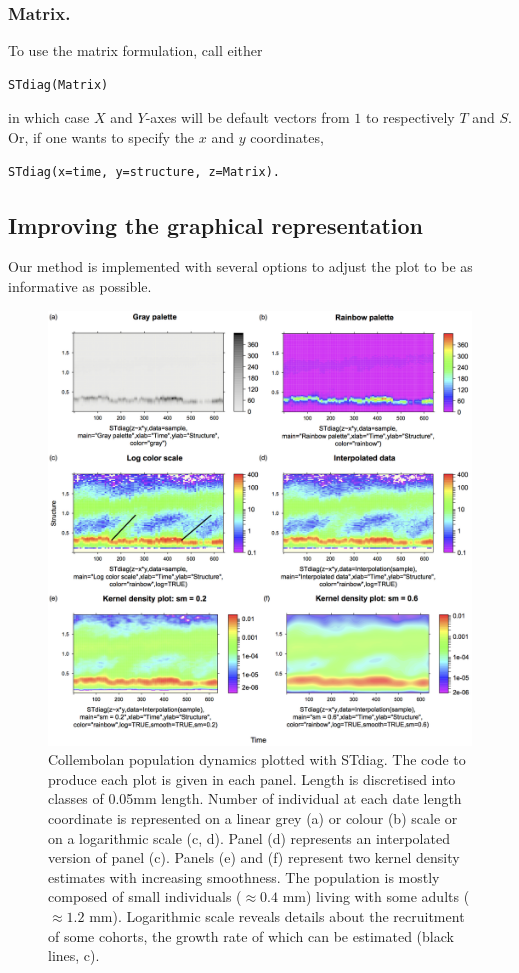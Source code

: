 \subsubsection{Matrix.}
To use the matrix formulation, call either
\begin{verbatim}
STdiag(Matrix)
\end{verbatim}
in which case $X$ and $Y$-axes will be default vectors from $1$ to respectively
$T$ and $S$. Or, if one wants to specify the $x$ and $y$ coordinates,
\begin{verbatim}
STdiag(x=time, y=structure, z=Matrix).
\end{verbatim}

\subsection{Improving the graphical representation}

Our method is implemented with several options to adjust the plot to be as
informative as possible.

\begin{figure}[!ht] %
\centering
\includegraphics[height=0.70\textheight]{2_Methodo/Fig/Fig22-2}
\caption[Collembolan population dynamics plotted
with STdiag]{ Collembolan population dynamics plotted with STdiag. The code to produce each plot is given in each panel. Length is discretised into classes of
0.05mm length. Number of individual at each date length coordinate is
represented on a linear grey (a) or colour (b) scale or on a logarithmic scale
(c, d). Panel (d) represents an interpolated version of panel (c). Panels (e)
and (f) represent two kernel density estimates with increasing smoothness. The
population is mostly composed of small individuals ($\approx0.4$ mm) living with some
adults ($\approx1.2$ mm). Logarithmic scale reveals details about the recruitment of
some cohorts, the growth rate of which can be estimated (black lines, c).
}
\label{Fig22-2}
\end{figure}

